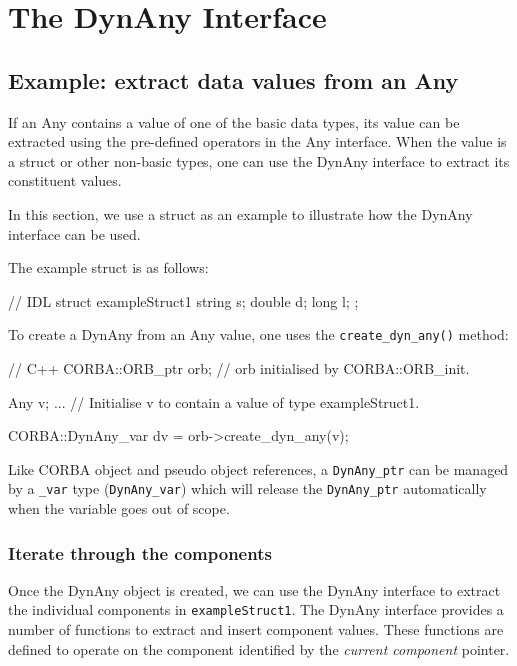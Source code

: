 \documentclass[11pt,twoside,a4paper]{book}
\newcommand{\type}[1]{\texttt{#1}}
\newcommand{\op}[1]{\texttt{#1()}}
\newcommand{\term}[1]{\textit{#1}}
\begin{document}
\section{The DynAny Interface}
\label{dynany}

\subsection{Example: extract data values from an Any}

If an Any contains a value of one of the basic data types, its value
can be extracted using the pre-defined operators in the Any interface.
When the value is a struct or other non-basic types, one can use the
DynAny interface to extract its constituent values.

In this section, we use a struct as an example to illustrate how the
DynAny interface can be used.

The example struct is as follows:

\begin{idllisting}
// IDL
struct exampleStruct1 {
  string s;
  double d;
  long   l;
};
\end{idllisting}

To create a DynAny from an Any value, one uses the
\op{create\_dyn\_any} method:

\begin{cxxlisting}
// C++
CORBA::ORB_ptr orb;  // orb initialised by CORBA::ORB_init.
  
Any v;
...       // Initialise v to contain a value of type exampleStruct1.
  
CORBA::DynAny_var dv = orb->create_dyn_any(v);
\end{cxxlisting}

Like CORBA object and pseudo object references, a \type{DynAny\_ptr}
can be managed by a \type{\_var} type (\type{DynAny\_var}) which will
release the \type{DynAny\_ptr} automatically when the variable goes
out of scope.

\subsubsection{Iterate through the components}
\label{dynanyiterate}

Once the DynAny object is created, we can use the DynAny interface to
extract the individual components in \type{exampleStruct1}. The DynAny
interface provides a number of functions to extract and insert
component values. These functions are defined to operate on the
component identified by the \term{current component} pointer.
\end{document}

